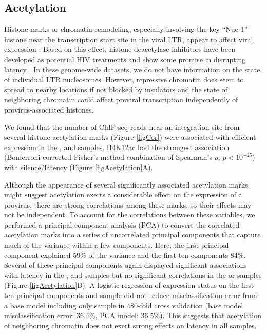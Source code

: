 \documentclass[../sherrill-Mix_thesis.tex]{subfiles}
\begin{document}
	\subsection{Acetylation}
	Histone marks or chromatin remodeling, especially involving the key ``Nuc-1'' histone near the transcription start site in the viral LTR, appear to affect viral expression \citep{Verdin1993,Lint1996,Pearson2008}. Based on this effect, histone deacetylase inhibitors have been developed as potential HIV treatments and show some promise in disrupting latency \citep{Archin2012}. In these genome-wide datasets, we do not have information on the state of individual LTR nucleosomes. However, repressive chromatin does seem to spread to nearby locations if not blocked by insulators \citep{Muller1930,Gaszner2006} and the state of neighboring chromatin could affect proviral transcription independently of provirus-associated histones. 

	We found that the number of ChIP-seq reads near an integration site from several histone acetylation marks (Figure \ref{figCor}) were associated with efficient expression in the \Active{}, \Resting{} and \Memory{} samples. H4K12ac had the strongest association (Bonferroni corrected Fisher's method combination of Spearman's $\rho$, $p<10^{-25}$) with silence/latency (Figure \ref{figAcetylation}A).
	
	Although the appearance of several significantly associated acetylation marks might suggest acetylation exerts a considerable effect on the expression of a provirus, there are strong correlations among these marks, so their effects may not be independent.  To account for the correlations between these variables, we performed a principal component analysis (PCA) to convert the correlated acetylation marks into a series of uncorrelated principal components that capture much of the variance within a few components. Here, the first principal component explained 59\% of the variance and the first ten components 84\%. Several of these principal components again displayed significant associations with latency in the \Active{}, \Resting{} and \Memory{} samples but no significant correlations in the \Bcl{} or \Jurkat{} samples (Figure \ref{figAcetylation}B). A logistic regression of expression status on the first ten principal components and sample did not reduce misclassification error from a base model including only sample in 480-fold cross validation (base model misclassification error: 36.4\%, PCA model: 36.5\%). This suggests that acetylation of neighboring chromatin does not exert strong effects on latency in all samples.
\end{document}
